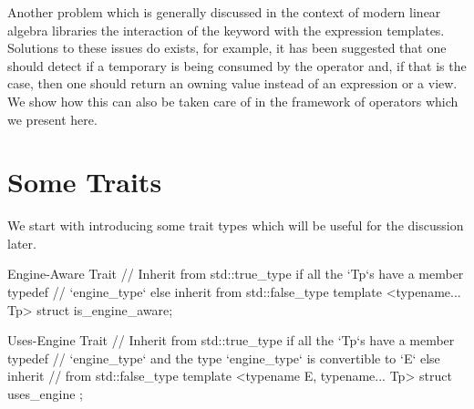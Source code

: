 \documentclass[oneside,11pt,a4paper]{jbarticle}
\begin{document}
Another problem which is generally discussed in the context of modern
linear algebra libraries the interaction of the  keyword with
the expression templates.  Solutions to these issues do exists, for example, it
has been suggested that one should detect if a temporary is being consumed by
the operator and, if that is the case, then one should return an owning value
instead of an expression or a view. We show how this can also be taken care of
in the framework of operators which we present here.

%
%
\section{Some Traits}
We start with introducing some trait types which will be useful for the
discussion later.

\begin{codecpp}{Engine-Aware Trait}
// Inherit from std::true_type if all the `Tp`s have a member typedef
// `engine_type` else inherit from std::false_type
template <typename... Tp>
struct is_engine_aware;
\end{codecpp}

\begin{codecpp}{Uses-Engine Trait}
// Inherit from std::true_type if all the `Tp`s have a member typedef
// `engine_type` and the type `engine_type` is convertible to `E` else inherit
// from std::false_type
template <typename E, typename... Tp>
struct uses_engine ;
\end{codecpp}
\end{document}
